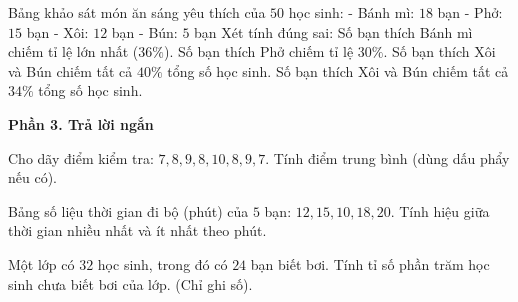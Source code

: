 \begin{ex} %
Bảng khảo sát món ăn sáng yêu thích của $50$ học sinh:
- Bánh mì: $18$ bạn
- Phở: $15$ bạn
- Xôi: $12$ bạn
- Bún: $5$ bạn
Xét tính đúng sai:
\choiceTF
{\True Số bạn thích Bánh mì chiếm tỉ lệ lớn nhất ($36\%$).}
{\True Số bạn thích Phở chiếm tỉ lệ $30\%$.}
{Số bạn thích Xôi và Bún chiếm tất cả $40\%$ tổng số học sinh.}
{\True Số bạn thích Xôi và Bún chiếm tất cả $34\%$ tổng số học sinh.}
\end{ex}

\textbf{Phần 3. Trả lời ngắn}

\begin{ex} %
Cho dãy điểm kiểm tra: $7, 8, 9, 8, 10, 8, 9, 7$. Tính điểm trung bình (dùng dấu phẩy nếu có).
\end{ex}

\begin{ex} %
Bảng số liệu thời gian đi bộ (phút) của $5$ bạn: $12, 15, 10, 18, 20$. Tính hiệu giữa thời gian nhiều nhất và ít nhất theo phút.
\end{ex}

\begin{ex} %
Một lớp có $32$ học sinh, trong đó có $24$ bạn biết bơi. Tính tỉ số phần trăm học sinh chưa biết bơi của lớp. (Chỉ ghi số).
\end{ex}

